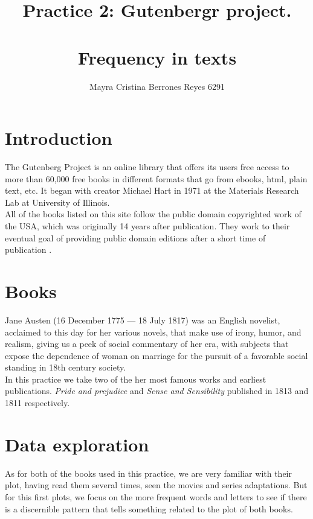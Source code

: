 \documentclass{article}
\begin{document}
\title{%
  Practice 2: Gutenbergr project. \\~\\
  \Large Frequency in texts}
\author{Mayra Cristina Berrones Reyes 6291}

\maketitle

\section{Introduction}

The Gutenberg Project is an online library that offers its users free access to more than 60,000 free books in different formats that go from ebooks, html, plain text, etc. It began with creator Michael Hart in 1971 at the Materials Research Lab at University of Illinois.\\

All of the books listed on this site follow the public domain copyrighted work of the USA, which was originally 14 years after publication. They work to their eventual goal of providing public domain editions after a short time of publication \cite{guten}.\\

\section{Books}

Jane Austen (16 December 1775 --- 18 July 1817) was an English novelist, acclaimed to this day for her various novels, that make use of irony, humor, and realism, giving us a peek of social commentary of her era, with subjects that expose the dependence of woman on marriage for the pursuit of a favorable social standing in 18th century society.\\

In this practice we take two of the her most famous works and earliest publications. \textit{Pride and prejudice} \cite{pride} and \textit{Sense and Sensibility} \cite{sense} published in 1813 and 1811 respectively.\\

\section{Data exploration}

As for both of the books used in this practice, we are very familiar with their plot, having read them several times, seen the movies and series adaptations. But for this first plots, we focus on the more frequent words and letters to see if there is a discernible pattern that tells something related to the plot of both books. \\%
\end{document}

